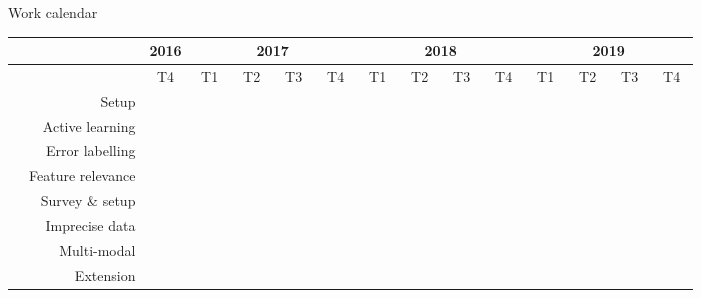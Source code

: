 \documentclass{beamer}
\begin{document}
\begin{frame}{Work calendar}
	\footnotesize
	\begin{table}
	\hspace*{-0.5cm}
	\setlength\tabcolsep{3pt} %
	\begin{tabular}{|c|r|ccc|cccccccccccc|cccccccccccc|cccccccccccc|}
		\hline
		& & \multicolumn{3}{c|}{2016} & \multicolumn{12}{c|}{2017} & \multicolumn{12}{c|}{2018}  & \multicolumn{12}{c|}{2019}  \\
		\hline	
		& & \multicolumn{3}{c|}{T4} & \multicolumn{3}{c|}{T1} & \multicolumn{3}{c|}{T2} & \multicolumn{3}{c|}{T3} & \multicolumn{3}{c|}{T4} & \multicolumn{3}{c|}{T1} & \multicolumn{3}{c|}{T2} & \multicolumn{3}{c|}{T3} & \multicolumn{3}{c|}{T4}  & \multicolumn{3}{c|}{T1} & \multicolumn{3}{c|}{T2} & \multicolumn{3}{c|}{T3} & \multicolumn{3}{c|}{T4}\\ 
		\hline
		& Setup & \cellcolor{black} & \cellcolor{black} & \cellcolor{black} & \cellcolor{black} & \cellcolor{black} & & & & & & & & & & & & & & & & & & & & & & & & & & & & & & & & & & \\
		\hdashline
		 \parbox[t]{2mm}{} & Active learning & & & & & &  &  &  &  & & & & & & & & & & & & & & & & & & & & & & & & & & & & & &\\
		& Error labelling & & & & & & & & & &  &  &  &  &  &  & & & & & & & & & & & & & & & & & & & & & & & & \\
		& Feature relevance & & & & & & & & & & & & & & & &  &  &  &  &  &  & & & & & & & & & & & & & & & & & & \\
		\hdashline
		 \parbox[t]{2mm}{} & Survey \& setup & & & & & & & & & & & & & & & & & & & & & &  & & & & & & & & & & & & & & & & & \\
		& Imprecise data & & & & & & & & & & & & & & & & & & & & & & &  &  &  &  &  &  &  & & & & & & & & & & \\
		& Multi-modal & & & & & & & & & & & & & & & & & & & & & & & & & & & & & &  &  &  &  &  &  & & & & \\
		\hdashline
		& Extension 
		& & & & & & & & & & & & & & & & & & & & & & & & & & & & & & & & & & & &  &  &  &  \\
		\hline 
	\end{tabular}



\end{table}
\end{frame}
\end{document}
